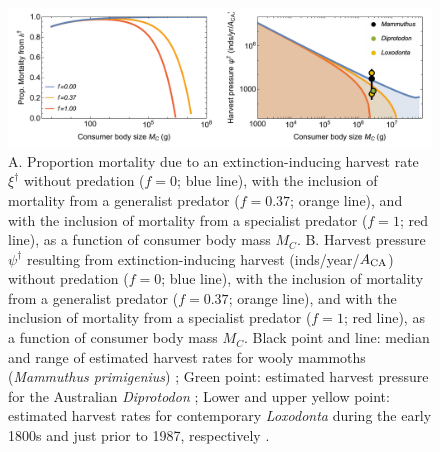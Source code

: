 \documentclass[]{rsos}%
\begin{document}
\begin{figure}
    \centering
    \includegraphics[width=1\textwidth]{fig_harvest.pdf}
    \caption{
        A. Proportion mortality due to an extinction-inducing harvest rate $\xi^\dagger$ without predation ($f=0$; blue line), with the inclusion of mortality from a generalist predator ($f=0.37$; orange line), and with the inclusion of mortality from a specialist predator ($f=1$; red line), as a function of consumer body mass $M_C$.
        B. Harvest pressure $\psi^\dagger$ resulting from extinction-inducing harvest (inds/year/$A_{\rm CA}$) without predation ($f=0$; blue line), with the inclusion of mortality from a generalist predator ($f=0.37$; orange line), and with the inclusion of mortality from a specialist predator ($f=1$; red line), as a function of consumer body mass $M_C$.
        Black point and line: median and range of estimated harvest rates for wooly mammoths (\emph{Mammuthus primigenius}) \cite{fordham2022process}; Green point: estimated harvest pressure for the Australian \emph{Diprotodon} \cite{bradshaw2021relative}; Lower and upper yellow point: estimated harvest rates for contemporary \emph{Loxodonta} during the early 1800s and just prior to 1987, respectively \cite{milner1993exploitation}.
    }
    \label{fig:harvest}
\end{figure}

\clearpage




\end{document}
